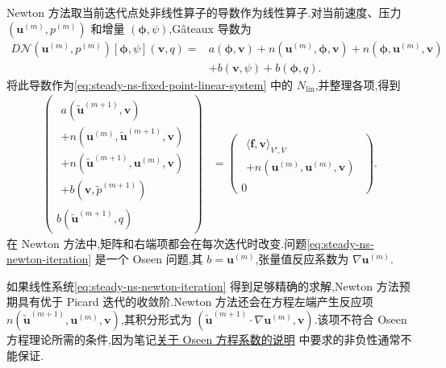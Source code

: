 \begin{note}[Newton 方法]\label{note:steady-ns-newton-method}
Newton 方法取当前迭代点处非线性算子的导数作为线性算子.对当前速度、压力
$(\bm{u}^{(m)},p^{(m)})$ 和增量 $(\symbf{\phi},\psi)$,Gâteaux 导数为
\[
\begin{aligned}
  D\mathcal{N}(\bm{u}^{(m)},p^{(m)})
       [\symbf{\phi},\psi](\bm{v},q)
   ={}&a(\symbf{\phi},\bm{v})
      +n(\bm{u}^{(m)},\symbf{\phi},\bm{v})
      +n(\symbf{\phi},\bm{u}^{(m)},\bm{v})\\
     &+b(\bm{v},\psi)+b(\symbf{\phi},q).
\end{aligned}
\]
将此导数作为\cref{eq:steady-ns-fixed-point-linear-system} 中的 $N_{\mathrm{lin}}$,并整理各项,得到
\begin{equation}\label{eq:steady-ns-newton-iteration}
\begin{aligned}
  \begin{pmatrix}
    \begin{gathered}
      a(\widetilde{\bm{u}}^{(m+1)},\bm{v})\\
      +n(\bm{u}^{(m)},\widetilde{\bm{u}}^{(m+1)},\bm{v})\\
      +n(\widetilde{\bm{u}}^{(m+1)},\bm{u}^{(m)},\bm{v})\\
      +b(\bm{v},\widetilde p^{(m+1)})
    \end{gathered}\\
    b(\widetilde{\bm{u}}^{(m+1)},q)
  \end{pmatrix}
  &=
  \begin{pmatrix}
    \begin{gathered}
      \langle\bm{f},\bm{v}\rangle_{V',V}\\
      +n(\bm{u}^{(m)},\bm{u}^{(m)},\bm{v})
    \end{gathered}\\
    0
  \end{pmatrix}.
\end{aligned}
\end{equation}
在 Newton 方法中,矩阵和右端项都会在每次迭代时改变.问题\cref{eq:steady-ns-newton-iteration} 是一个 Oseen 问题,其 $b=\bm{u}^{(m)}$,张量值反应系数为 $\nabla\bm{u}^{(m)}$.
\end{note}

\begin{note}[关于 Newton 方法]\label{note:steady-ns-newton-convergence}
如果线性系统\cref{eq:steady-ns-newton-iteration} 得到足够精确的求解,Newton 方法预期具有优于 Picard 迭代的收敛阶.Newton 方法还会在方程左端产生反应项
$n(\widetilde{\bm{u}}^{(m+1)},\bm{u}^{(m)},\bm{v})$,其积分形式为
$(\widetilde{\bm{u}}^{(m+1)}\cdot\nabla\bm{u}^{(m)},\bm{v})$.该项不符合 Oseen 方程理论所需的条件,因为笔记\hyperref[note:oseen-coefficients]{关于 Oseen 方程系数的说明} 中要求的非负性通常不能保证.
\end{note}


